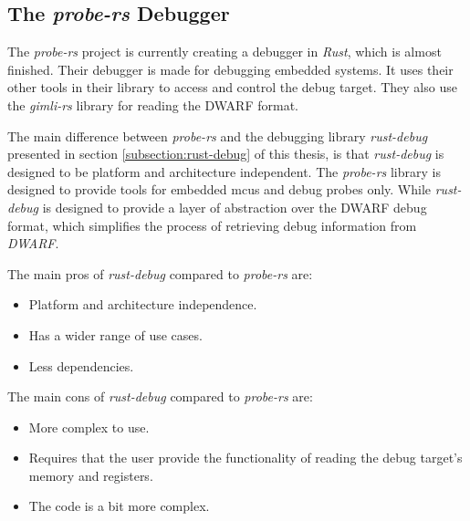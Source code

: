 

\subsection{The \emph{probe-rs} Debugger}

The \emph{probe-rs} project is currently creating a debugger in \emph{Rust}, which is almost finished.
Their debugger is made for debugging embedded systems.
It uses their other tools in their library to access and control the debug target.
They also use the \emph{gimli-rs} library for reading the \gls{DWARF} format.


The main difference between \emph{probe-rs} and the debugging library \emph{rust-debug} presented in section \ref{subsection:rust-debug} of this thesis, is that \emph{rust-debug} is designed to be platform and architecture independent.
The \emph{probe-rs} library is designed to provide tools for embedded \glspl{mcu} and debug probes only.
While \emph{rust-debug} is designed to provide a layer of abstraction over the \gls{DWARF} debug format, which simplifies the process of retrieving debug information from \emph{DWARF}.

The main pros of \emph{rust-debug} compared to \emph{probe-rs} are:
\begin{itemize}
  \item Platform and architecture independence.
  \item Has a wider range of use cases.
  \item Less dependencies.
\end{itemize}

The main cons of \emph{rust-debug} compared to \emph{probe-rs} are:
\begin{itemize}
  \item More complex to use.
  \item Requires that the user provide the functionality of reading the debug target's memory and registers.
  \item The code is a bit more complex.
\end{itemize}



